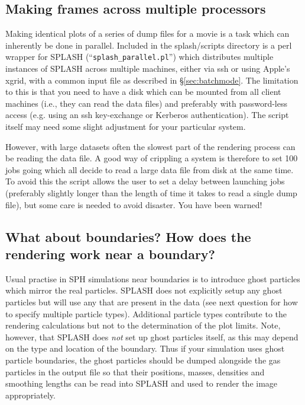 \documentclass[a4paper,10pt]{article}
\newcommand{\splash}{\textsc{SPLASH }}
\begin{document}
\subsection{Making frames across multiple processors}
 Making identical plots of a series of dump files for a movie is a task which can inherently be done in parallel. Included in the splash/scripts directory is a perl wrapper for \splash (``\verb+splash_parallel.pl+'') which distributes multiple instances of \splash across multiple machines, either via ssh or using Apple's xgrid, with a common input file as described in \S\ref{sec:batchmode}. The limitation to this is that you need to have a disk which can be mounted from all client machines (i.e., they can read the data files) and preferably with password-less access (e.g. using an ssh key-exchange or Kerberos authentication). The script itself may need some slight adjustment for your particular system.
 
However, with large datasets often the slowest part of the rendering process can be reading the data file. A good way of crippling a system is therefore to set 100 jobs going which all decide to read a large data file from disk at the same time. To avoid this the script allows the user to set a delay between launching jobs (preferably slightly longer than the length of time it takes to read a single dump file), but some care is needed to avoid disaster. You have been warned! 

\subsection{What about boundaries? How does the rendering work near a boundary?}
 Usual practise in SPH simulations near boundaries is
to introduce ghost particles which mirror the real particles. \splash does not
explicitly setup any ghost particles but will use any that are present in the data
(see next question for how to specify multiple particle types). Additional particle types contribute
to the rendering calculations but not to the determination of the plot limits. Note,
however, that \splash does \emph{not} set up ghost particles itself, as this may depend
on the type and location of the boundary. Thus if your simulation uses ghost particle
boundaries, the ghost particles should be dumped alongside the gas particles in the
output file so that their positions, masses, densities and smoothing lengths can be
read into \splash and used to render the image appropriately.
\end{document}
